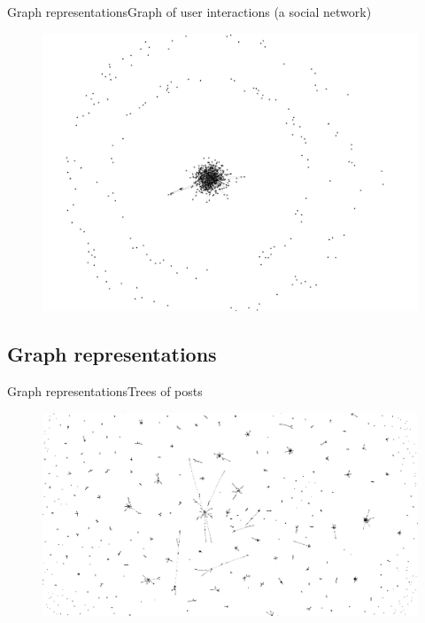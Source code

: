 \documentclass{beamer}
\begin{document}
\begin{frame}{Graph representations}{Graph of user interactions (a social network)}
	\begin{figure}
		\centering
		\includegraphics[width=1\textwidth]{sna}	
	\end{figure}
\end{frame}

\subsection{Graph representations}
\begin{frame}{Graph representations}{Trees of posts}
\begin{figure}
	\centering
	\includegraphics[width=1\textwidth]{forest}	
\end{figure}
\end{frame}
\end{document}
